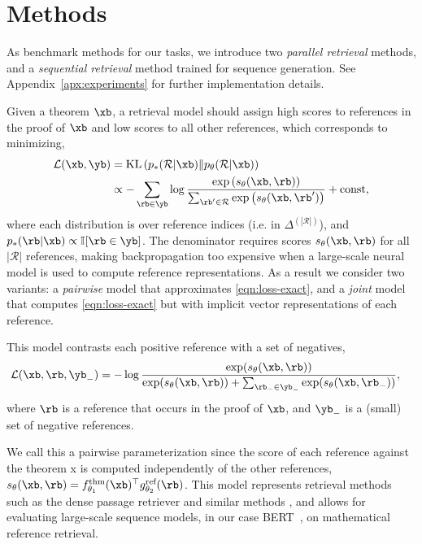 \section{Methods}
\label{sec:methods}
As benchmark methods for our tasks, we introduce two \textit{parallel retrieval} methods, and a \textit{sequential retrieval} method trained for sequence generation. 
See Appendix~\ref{apx:experiments} for further implementation details.

Given a theorem $\xb$, a retrieval model should assign high scores to references in the proof of $\xb$ and low scores to all other references, which corresponds to minimizing,
\begin{align}
\label{eqn:loss-exact}
    \mathcal{L}(\xb,\yb) &= \mathrm{KL}\left(p_*(\mathcal{R}|\xb)\|p_{\theta}(\mathcal{R}|\xb)\right)\\
    &\propto -\sum_{\rb\in \yb}\log \frac{\exp\left(s_\theta(\xb,\rb)\right)}{\sum_{\rb'\in\mathcal{R}}\exp\left(s_{\theta}(\xb,\rb')\right)} + \text{const},
\end{align}
where each distribution is over reference indices (i.e. in $\Delta^{(|\mathcal{R}|)}$),  and $p_*(\rb|\xb)\propto \mathbb{I}[\rb\in \yb]$. 
The denominator requires scores $s_{\theta}(\xb,\rb)$ for all $|\mathcal{R}|$ references, making backpropagation too expensive when a large-scale neural model is used to compute reference representations.
As a result we consider two variants: a \textit{pairwise} model that approximates \autoref{eqn:loss-exact}, and a \textit{joint} model that computes \autoref{eqn:loss-exact} but with implicit vector representations of each reference.

This model contrasts each positive reference with a set of negatives,
\begin{align}
    \mathcal{L}(\xb, \rb, \yb_-) &= -\log \frac{\exp(s_\theta(\xb, \rb))}{\exp(s_\theta(\xb, \rb))+\sum_{\rb_-\in \yb_-}\exp(s_\theta(\xb, \rb_-))},
\end{align}
where $\rb$ is a reference that occurs in the proof of $\xb$, and $\yb_-$ is a (small) set of negative references.

We call this a pairwise parameterization since the score of each reference against the theorem x is computed independently of the other references,
$s_{\theta}(\xb,\rb)=f_{\theta_1}^{\text{thm}}(\xb)^\top g_{\theta_2}^{\text{ref}}(\rb)$.
This model represents retrieval methods such as the dense passage retriever \citep{karpukhin2020dense} and similar methods \citep{nogueira2020passage}, and allows for evaluating large-scale sequence models, in our case BERT~\citep{devlin2019bert}, on mathematical reference retrieval.

